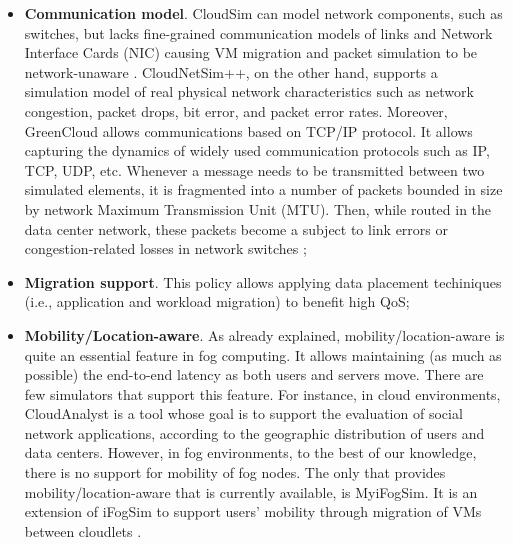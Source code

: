 \begin{itemize}[noitemsep]
\item \textbf{Communication model}. CloudSim can model network components, such as switches, but lacks fine-grained communication models of links and Network Interface Cards (NIC) causing VM migration and packet simulation to be network-unaware \cite{malik2017cloudnetsim++}. CloudNetSim++, on the other hand, supports a simulation model of real physical network characteristics such as network congestion, packet drops, bit error, and packet error rates. Moreover, GreenCloud allows communications based on TCP/IP protocol. It allows capturing the dynamics of widely used communication protocols such as IP, TCP, UDP, etc. Whenever a message needs to be transmitted between two simulated elements, it is fragmented into a number of packets bounded in size by network Maximum Transmission Unit (MTU). Then, while routed in the data center network, these packets become a subject to link errors or congestion-related losses in network switches \cite{kliazovich2012greencloud};
\item \textbf{Migration support}. This policy allows applying data placement techiniques (i.e., application and workload migration) to benefit high QoS;
\item \textbf{Mobility/Location-aware}. As already explained, mobility/location-aware is quite an essential feature in fog computing. It allows maintaining (as much as possible) the end-to-end latency as both users and servers move. There are few simulators that support this feature. For instance, in cloud environments, CloudAnalyst \cite{wickremasinghe2010cloudanalyst} is a tool whose goal is to support the evaluation of social network applications, according to the geographic distribution of users and data centers. However, in fog environments, to the best of our knowledge, there is no support for mobility of fog nodes. The only that provides mobility/location-aware that is currently available, is MyiFogSim. It is an extension of iFogSim to support users' mobility through migration of VMs between cloudlets \cite{lopes2017myifogsim}.
\end{itemize}